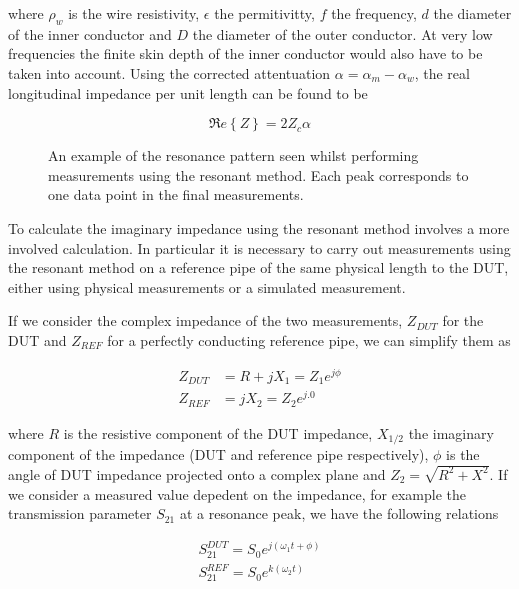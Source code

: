 where $\rho_{w}$ is the wire resistivity, $\epsilon$ the permitivitty, $f$ the frequency, $d$ the diameter of the inner conductor and $D$ the diameter of the outer conductor. At very low frequencies the finite skin depth of the inner conductor would also have to be taken into account. Using the corrected attentuation $\alpha = \alpha_{m} - \alpha_{w}$, the real longitudinal impedance per unit length can be found to be 

\begin{equation}
\Re e\left\{ Z \right\} = 2Z_{c} \alpha
\label{eqn:res_imp}
\end{equation}

\begin{figure}

\label{fig:res-resonancce-examples}
\caption{An example of the resonance pattern seen whilst performing measurements using the resonant method. Each peak corresponds to one data point in the final measurements.}
\end{figure}

To calculate the imaginary impedance using the resonant method involves a more involved calculation. In particular it is necessary to carry out measurements using the resonant method on a reference pipe of the same physical length to the DUT, either using physical measurements or a simulated measurement.

If we consider the complex impedance of the two measurements, $Z_{DUT}$ for the DUT and $Z_{REF}$ for a perfectly conducting reference pipe, we can simplify them as

\begin{align}
Z_{DUT} & =  R + jX_{1}  =  Z_{1}e^{j \phi} \\
Z_{REF} & =  jX_{2}  =  Z_{2}e^{j.0}
\end{align}

where $R$ is the resistive component of the DUT impedance, $X_{1/2}$ the imaginary component of the impedance (DUT and reference pipe respectively), $\phi$ is the angle of DUT impedance projected onto a complex plane and $Z_{2} = \sqrt{R^{2} + X^{2}}$. If we consider a measured value depedent on the impedance, for example the transmission parameter $S_{21}$ at a resonance peak, we have the following relations

\begin{align}
S_{21}^{DUT} = S_{0}e^{j \left( \omega_{1}t + \phi \right)} \\
S_{21}^{REF} = S_{0}e^{k \left( \omega_{2}t \right)}
\end{align}

